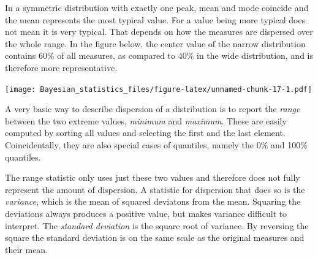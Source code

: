 \documentclass[]{svmono}
\newenvironment{Shaded}{\begin{snugshade}}{\end{snugshade}}
\newcommand{\KeywordTok}[1]{\textcolor[rgb]{0.13,0.29,0.53}{\textbf{#1}}}
\newcommand{\DataTypeTok}[1]{\textcolor[rgb]{0.13,0.29,0.53}{#1}}
\newcommand{\DecValTok}[1]{\textcolor[rgb]{0.00,0.00,0.81}{#1}}
\newcommand{\StringTok}[1]{\textcolor[rgb]{0.31,0.60,0.02}{#1}}
\newcommand{\OperatorTok}[1]{\textcolor[rgb]{0.81,0.36,0.00}{\textbf{#1}}}
\newcommand{\NormalTok}[1]{#1}
\theoremstyle{definition}
\theoremstyle{definition}
\theoremstyle{definition}
\theoremstyle{remark}
\begin{document}
In a symmetric distribution with exactly one peak, mean and mode
coincide and the mean represents the most typical value. For a value
being more typical does not mean it is very typical. That depends on how
the measures are dispersed over the whole range. In the figure below,
the center value of the narrow distribution contains 60\% of all
measures, as compared to 40\% in the wide distribution, and is therefore
more representative.

\begin{Shaded}
\end{Shaded}

\texttt{[image: Bayesian\_statistics\_files/figure-latex/unnamed-chunk-17-1.pdf]}

A very basic way to describe dispersion of a distribution is to report
the \emph{range} between the two extreme values, \emph{minimum} and
\emph{maximum}. These are easily computed by sorting all values and
selecting the first and the last element. Coincidentally, they are also
special cases of quantiles, namely the 0\% and 100\% quantiles.

The range statistic only uses just these two values and therefore does
not fully represent the amount of dispersion. A statistic for dispersion
that does so is the \emph{variance}, which is the mean of squared
deviatons from the mean. Squaring the deviations always produces a
positive value, but makes variance difficult to interpret. The
\emph{standard deviation} is the square root of variance. By reversing
the square the standard deviation is on the same scale as the original
measures and their mean.
\end{document}
